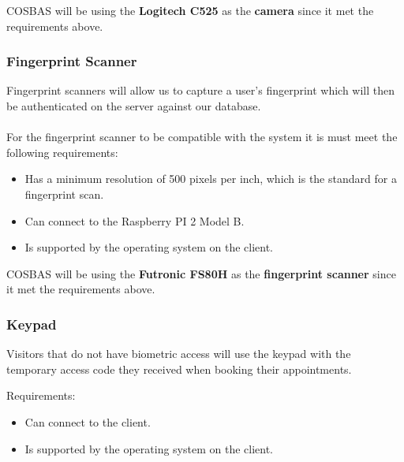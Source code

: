 COSBAS will be using the \textbf{Logitech C525} as the \textbf{ camera} since it met the requirements above.
	
	\subsubsection{Fingerprint Scanner}
	Fingerprint scanners will allow us to capture a user's fingerprint which will then be authenticated on the server against our database. \\
\\
For the fingerprint scanner to be compatible with the system it is must meet the following requirements:
	\begin{itemize}
		\item Has a minimum resolution of 500 pixels per inch, which is the standard for a fingerprint scan.
		\item Can connect to the Raspberry PI 2 Model B.
		\item Is supported by the operating system on the client.
	\end{itemize}
	
COSBAS will be using the \textbf{Futronic FS80H} as the \textbf{fingerprint scanner} since it met the requirements above.
	
	\subsubsection{Keypad}
Visitors that do not have biometric access will use the keypad with the temporary access code they received when booking their appointments.

Requirements:
	\begin{itemize}
		\item Can connect to the client.
		\item Is supported by the operating system on the client.
	\end{itemize}


		